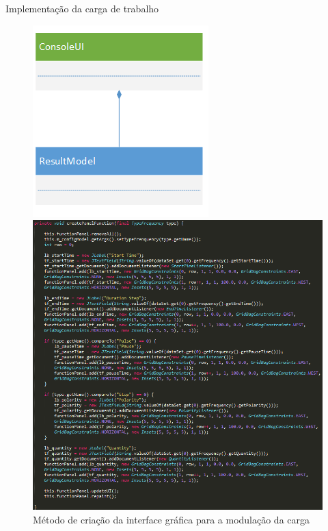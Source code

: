 \begin{frame}{Implementação da carga de trabalho}
	\begin{figure}
		\centering
		\begin{minipage}{.3\textwidth}
			\centering
			\includegraphics[scale=0.35]{images/diagram-code3.png}	
		\end{minipage}
		\begin{minipage}{.6\textwidth}
			\centering
			\includegraphics[scale=0.3]{images/code3.png}	
		\end{minipage}
		\caption{Método de criação da interface gráfica para a modulação da carga}
	\end{figure}
	
\end{frame}



